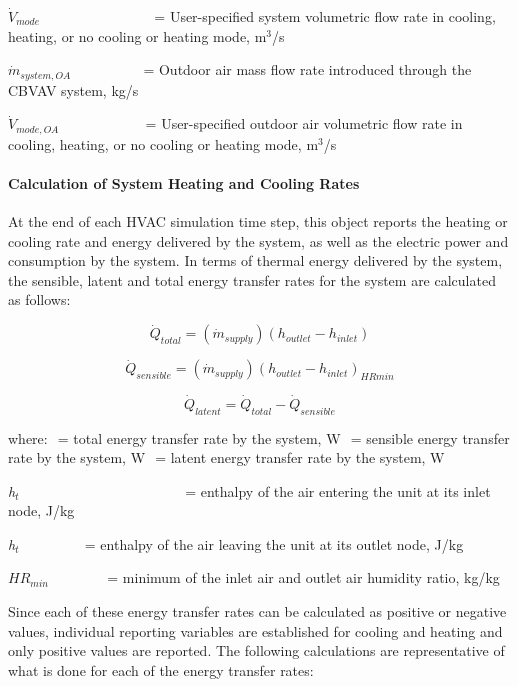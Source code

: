 \({\dot V_{mode}}\) ~~~~~~~~~~~~~~~ = User-specified system volumetric flow rate in cooling, heating, or no cooling or heating mode, m\(^{3}\)/s

\({\dot m_{system,OA}}\) ~~~~~~~~~ = Outdoor air mass flow rate introduced through the CBVAV system, kg/s

\({\dot V_{mode,OA}}\) ~~~~~~~~~~~ = User-specified outdoor air volumetric flow rate in cooling, heating, or no cooling or heating mode, m\(^{3}\)/s

\paragraph{Calculation of System Heating and Cooling Rates}\label{calculation-of-system-heating-and-cooling-rates}

At the end of each HVAC simulation time step, this object reports the heating or cooling rate and energy delivered by the system, as well as the electric power and consumption by the system. In terms of thermal energy delivered by the system, the sensible, latent and total energy transfer rates for the system are calculated as follows:

\begin{equation}
{\dot Q_{total}} = ({\dot m_{supply}})({h_{outlet}} - {h_{inlet}})
\end{equation}

\begin{equation}
{\dot Q_{sensible}} = ({\dot m_{supply}}){({h_{outlet}} - {h_{inlet}})_{HRmin}}
\end{equation}

\begin{equation}
{\dot Q_{latent}} = {\dot Q_{total}} - {\dot Q_{sensible}}
\end{equation}

where: \(_{ }\) = total energy transfer rate by the system, W \(_{ }\) = sensible energy transfer rate by the system, W \(_{ }\) = latent energy transfer rate by the system, W

\emph{h\(_{t}\)}~~~~~~~~~~~~~~~~~~~~~~~ = enthalpy of the air entering the unit at its inlet node, J/kg

\emph{h\(_{t}\)} ~~~~~~~~ = enthalpy of the air leaving the unit at its outlet node, J/kg

\(H{R_{min}}\) ~~~~~~~ = minimum of the inlet air and outlet air humidity ratio, kg/kg

Since each of these energy transfer rates can be calculated as positive or negative values, individual reporting variables are established for cooling and heating and only positive values are reported. The following calculations are representative of what is done for each of the energy transfer rates:

